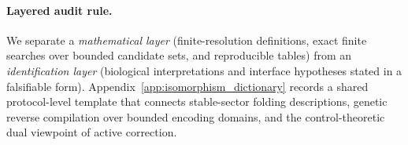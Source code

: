 \paragraph{Layered audit rule.}
We separate a \emph{mathematical layer} (finite-resolution definitions, exact finite searches over bounded candidate sets, and reproducible tables) from an \emph{identification layer} (biological interpretations and interface hypotheses stated in a falsifiable form).
Appendix~\ref{app:isomorphism_dictionary} records a shared protocol-level template that connects stable-sector folding descriptions, genetic reverse compilation over bounded encoding domains, and the control-theoretic dual viewpoint of active correction.

\tableofcontents
\newpage


